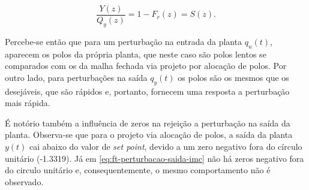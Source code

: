 \begin{equation}
    \label{eq:ft-perturbacao-saida-imc}
    \frac{Y(z)}{Q_y(z)} = 1-F_r(z) = S(z).
\end{equation}

Percebe-se então que para um perturbação na entrada da planta $q_u(t)$, aparecem
os polos da própria planta, que neste caso são polos lentos se comparados com os
da malha fechada via projeto por alocação de polos. Por outro lado, para
perturbações na saída $q_y(t)$ os polos são os mesmos que os desejáveis, que são
rápidos e, portanto, fornecem uma resposta a perturbação mais rápida. 

É notório também a influência de zeros na rejeição a perturbação na saída da
planta. Observa-se que para o projeto via alocação de polos, a saída da planta
$y(t)$ cai abaixo do valor de \textit{set point}, devido a um zero negativo fora
do círculo unitário (-1.3319). Já em \ref{eq:ft-perturbacao-saida-imc} não há
zeros negativo fora do circulo unitário e, consequentemente, o mesmo
comportamento não é observado.